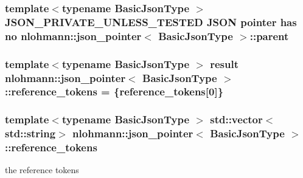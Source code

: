 \subsubsection[{\texorpdfstring{parent}{parent}}]{\setlength{\rightskip}{0pt plus 5cm}template$<$typename Basic\+Json\+Type $>$ {\bf J\+S\+O\+N\+\_\+\+P\+R\+I\+V\+A\+T\+E\+\_\+\+U\+N\+L\+E\+S\+S\+\_\+\+T\+E\+S\+T\+ED} J\+S\+ON pointer has no {\bf nlohmann\+::json\+\_\+pointer}$<$ Basic\+Json\+Type $>$\+::parent\hspace{0.3cm}{\ttfamily [private]}}\hypertarget{classnlohmann_1_1json__pointer_a9d826fc24f7821325e4f24d4393d6adc}{}\label{classnlohmann_1_1json__pointer_a9d826fc24f7821325e4f24d4393d6adc}
\subsubsection[{\texorpdfstring{reference\+\_\+tokens}{reference_tokens}}]{\setlength{\rightskip}{0pt plus 5cm}template$<$typename Basic\+Json\+Type $>$ {\bf result} {\bf nlohmann\+::json\+\_\+pointer}$<$ Basic\+Json\+Type $>$\+::reference\+\_\+tokens = \{reference\+\_\+tokens\mbox{[}0\mbox{]}\}\hspace{0.3cm}{\ttfamily [private]}}\hypertarget{classnlohmann_1_1json__pointer_a468dde132b1384d962c75eca7306f6cb}{}\label{classnlohmann_1_1json__pointer_a468dde132b1384d962c75eca7306f6cb}
\subsubsection[{\texorpdfstring{reference\+\_\+tokens}{reference_tokens}}]{\setlength{\rightskip}{0pt plus 5cm}template$<$typename Basic\+Json\+Type $>$ std\+::vector$<$std\+::string$>$ {\bf nlohmann\+::json\+\_\+pointer}$<$ Basic\+Json\+Type $>$\+::reference\+\_\+tokens\hspace{0.3cm}{\ttfamily [private]}}\hypertarget{classnlohmann_1_1json__pointer_a07a990a6838de4f38ee9d881e7b9fd61}{}\label{classnlohmann_1_1json__pointer_a07a990a6838de4f38ee9d881e7b9fd61}


the reference tokens 

